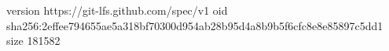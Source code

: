 version https://git-lfs.github.com/spec/v1
oid sha256:2effee794655ae5a318bf70300d954ab28b95d4a8b9b5f6cfc8e8e85897c5dd1
size 181582
